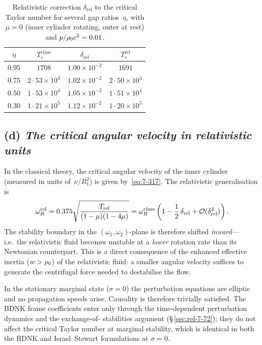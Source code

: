 \begin{table}[ht]
\centering
\caption{Relativistic correction $\delta_{\mathrm{rel}}$ to the
  critical Taylor number for several gap ratios~$\eta$, with
  $\mu = 0$ (inner cylinder rotating, outer at rest) and
  $p/\rho_0 c^{2}=0.01$.}
\label{tab:rel-XXXV}
\medskip
\small
\begin{tabular}{cccc}
\hline
$\eta$ & $T_{c}^{\mathrm{class}}$ & $\delta_{\mathrm{rel}}$
  & $T_{c}^{\mathrm{rel}}$ \\
\hline
$0.95$ & $1708$ & $1.00\times10^{-2}$ & $1691$ \\
$0.75$ & $2{\cdot}53\times10^{3}$ & $1.02\times10^{-2}$ & $2{\cdot}50\times10^{3}$ \\
$0.50$ & $1{\cdot}53\times10^{4}$ & $1.05\times10^{-2}$ & $1{\cdot}51\times10^{4}$ \\
$0.30$ & $1{\cdot}21\times10^{5}$ & $1.12\times10^{-2}$ & $1{\cdot}20\times10^{5}$ \\
\hline
\end{tabular}
\end{table}

\subsection*{(d) \textit{The critical angular velocity in
  relativistic units}}
\label{sec:rel-7-73d}

In the classical theory, the critical angular velocity of the inner
cylinder (measured in units of~$\nu/R_{1}^{2}$) is given
by~\eqref{eq:7-317}.  The relativistic generalisation is
\begin{equation}
\label{eq:rel-7-306}
\omega_{R}^{\mathrm{rel}}
= 0.375\sqrt{\frac{T_{\mathrm{rel}}}{(1-\mu)(1-4\mu)}}
= \omega_{R}^{\mathrm{class}}
  \left(1 - \frac{1}{2}\,\delta_{\mathrm{rel}}
           + \mathcal{O}(\delta_{\mathrm{rel}}^{2})\right).
\end{equation}
The stability boundary in the $(\omega_{1},\omega_{2})$-plane is
therefore shifted \emph{inward}---i.e.\ the relativistic fluid becomes
unstable at a \emph{lower} rotation rate than its Newtonian counterpart.
This is a direct consequence of the enhanced effective inertia
($w > \rho_0$) of the relativistic fluid: a smaller angular
velocity suffices to generate the centrifugal force needed to
destabilise the flow.

\begin{causalitycheck}
In the stationary marginal state ($\sigma = 0$) the perturbation
equations are elliptic and no propagation speeds arise.  Causality is
therefore trivially satisfied.  The BDNK frame coefficients enter only
through the time-dependent perturbation dynamics and the exchange-of-%
stabilities argument (\S\,\ref{sec:rel-7-72}); they do not affect the
critical Taylor number at marginal stability, which is identical in
both the BDNK and Israel--Stewart formulations at $\sigma=0$.
\end{causalitycheck}

